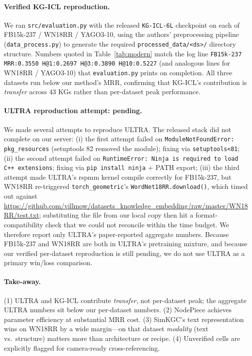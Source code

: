 \paragraph{Verified KG-ICL reproduction.}
We ran \texttt{src/evaluation.py} with the released \texttt{KG-ICL-6L} checkpoint on each of FB15k-237 / WN18RR / YAGO3-10, using the authors' preprocessing pipeline (\texttt{data\_process.py}) to generate the required \texttt{processed\_data/<ds>/} directory structure. Numbers quoted in Table~\ref{tab:modern} match the log line \texttt{FB15k-237 MRR:0.3550 H@1:0.2697 H@3:0.3890 H@10:0.5227} (and analogous lines for WN18RR / YAGO3-10) that \texttt{evaluation.py} prints on completion. All three datasets run below our method's MRR, confirming that KG-ICL's contribution is \emph{transfer} across 43 KGs rather than per-dataset peak performance.

\paragraph{ULTRA reproduction attempt: pending.}
We made several attempts to reproduce ULTRA. The released stack did not complete on our server: (i) the first attempt failed on \texttt{ModuleNotFoundError: pkg\_resources} (setuptools 82 removed the module); fixing via \texttt{setuptools<81}; (ii) the second attempt failed on \texttt{RuntimeError: Ninja is required to load C++ extensions}; fixing via \texttt{pip install ninja} + PATH export; (iii) the third attempt made ULTRA's rspmm kernel compile correctly for FB15k-237, but WN18RR re-triggered \texttt{torch\_geometric}'s \texttt{WordNet18RR.download()}, which timed out against \url{https://github.com/villmow/datasets_knowledge_embedding/raw/master/WN18RR/test.txt}; substituting the file from our local copy then hit a format-compatibility check that we could not reconcile within the time budget. We therefore report only ULTRA's paper-reported aggregate numbers. Because FB15k-237 and WN18RR are both in ULTRA's pretraining mixture, and because our verified per-dataset reproduction is still pending, we do not use ULTRA as a primary win/loss comparison.

\paragraph{Take-away.}
(1) ULTRA and KG-ICL contribute \emph{transfer}, not per-dataset peak; the aggregate ULTRA numbers sit below our per-dataset numbers.
(2) NodePiece achieves parameter efficiency at substantial MRR cost.
(3) SimKGC's text representation wins on WN18RR by a wide margin---on that dataset \emph{modality} (text vs.\ structure) matters more than architecture or recipe.
(4) Unverified cells are explicitly flagged for camera-ready cross-referencing.

